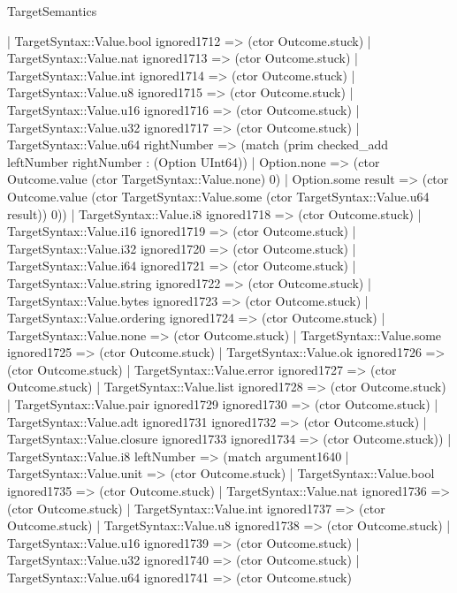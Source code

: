 \begin{lexlean}{TargetSemantics}
\begin{semanticmodule}
{              | TargetSyntax::Value.bool ignored1712 => (ctor Outcome.stuck)
              | TargetSyntax::Value.nat ignored1713 => (ctor Outcome.stuck)
              | TargetSyntax::Value.int ignored1714 => (ctor Outcome.stuck)
              | TargetSyntax::Value.u8 ignored1715 => (ctor Outcome.stuck)
              | TargetSyntax::Value.u16 ignored1716 => (ctor Outcome.stuck)
              | TargetSyntax::Value.u32 ignored1717 => (ctor Outcome.stuck)
              | TargetSyntax::Value.u64 rightNumber => (match (prim checked_add leftNumber rightNumber : (Option UInt64))
                | Option.none => (ctor Outcome.value (ctor TargetSyntax::Value.none) 0)
                | Option.some result => (ctor Outcome.value (ctor TargetSyntax::Value.some (ctor TargetSyntax::Value.u64 result)) 0))
              | TargetSyntax::Value.i8 ignored1718 => (ctor Outcome.stuck)
              | TargetSyntax::Value.i16 ignored1719 => (ctor Outcome.stuck)
              | TargetSyntax::Value.i32 ignored1720 => (ctor Outcome.stuck)
              | TargetSyntax::Value.i64 ignored1721 => (ctor Outcome.stuck)
              | TargetSyntax::Value.string ignored1722 => (ctor Outcome.stuck)
              | TargetSyntax::Value.bytes ignored1723 => (ctor Outcome.stuck)
              | TargetSyntax::Value.ordering ignored1724 => (ctor Outcome.stuck)
              | TargetSyntax::Value.none => (ctor Outcome.stuck)
              | TargetSyntax::Value.some ignored1725 => (ctor Outcome.stuck)
              | TargetSyntax::Value.ok ignored1726 => (ctor Outcome.stuck)
              | TargetSyntax::Value.error ignored1727 => (ctor Outcome.stuck)
              | TargetSyntax::Value.list ignored1728 => (ctor Outcome.stuck)
              | TargetSyntax::Value.pair ignored1729 ignored1730 => (ctor Outcome.stuck)
              | TargetSyntax::Value.adt ignored1731 ignored1732 => (ctor Outcome.stuck)
              | TargetSyntax::Value.closure ignored1733 ignored1734 => (ctor Outcome.stuck))
            | TargetSyntax::Value.i8 leftNumber => (match argument1640
              | TargetSyntax::Value.unit => (ctor Outcome.stuck)
              | TargetSyntax::Value.bool ignored1735 => (ctor Outcome.stuck)
              | TargetSyntax::Value.nat ignored1736 => (ctor Outcome.stuck)
              | TargetSyntax::Value.int ignored1737 => (ctor Outcome.stuck)
              | TargetSyntax::Value.u8 ignored1738 => (ctor Outcome.stuck)
              | TargetSyntax::Value.u16 ignored1739 => (ctor Outcome.stuck)
              | TargetSyntax::Value.u32 ignored1740 => (ctor Outcome.stuck)
              | TargetSyntax::Value.u64 ignored1741 => (ctor Outcome.stuck)
}
\end{semanticmodule}
\end{lexlean}
